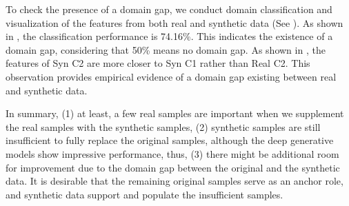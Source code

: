 To check the presence of a domain gap, we conduct domain classification and visualization of the features from both real and synthetic data (See ).
As shown in , the classification performance is 74.16\%.
This indicates the existence of a domain gap, considering that 50\% means no domain gap.
As shown in , the features of Syn C2 are more closer to Syn C1 rather than Real C2.
This observation provides empirical evidence of a domain gap existing between real and synthetic data.


In summary, (1) at least, a few real samples are important when we supplement the real samples with the synthetic samples,
(2) synthetic samples are still insufficient to fully replace the original samples, although the deep generative models show impressive performance,
thus, (3) there might be additional room for improvement due to the domain gap between the original and the synthetic data.
It is desirable that the remaining original samples serve as an anchor role, and synthetic data support and populate the insufficient samples.






